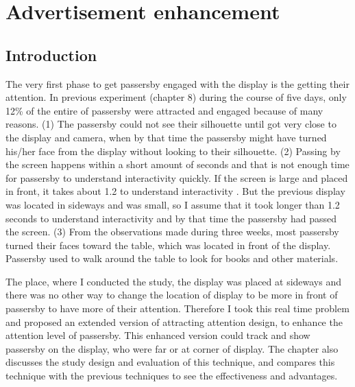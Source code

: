 \chapter{Advertisement enhancement} %

\label{Chapter9} %
\newpage

\section{Introduction}

The very first phase to get passersby engaged with the display is the getting their attention. In previous experiment (chapter 8) during the course of five days, only 12\% of the entire of passersby were attracted and engaged because of many reasons. (1) The passersby could not see their silhouette until got very close to the display and camera, when by that time the passersby might have turned his/her face from the display without looking to their silhouette. (2) Passing by the screen happens within a short amount of seconds and that is not enough time for passersby to understand interactivity quickly. If the screen is large and placed in front, it takes about 1.2 to understand interactivity \cite{LookingGlass}. But the previous display was located in sideways and was small, so I assume that it took longer than 1.2 seconds to understand interactivity and by that time the passersby had passed the screen. (3) From the observations made during three weeks, most passersby turned their faces toward the table, which was located in front of the display. Passersby used to walk around the table to look for books and other materials. 

The place, where I conducted the study, the display was placed at sideways and there was no other way to change the location of display to be more in front of passersby to have more of their attention. Therefore I took this real time problem and proposed an extended version of attracting attention design, to enhance the attention level of passersby. This enhanced version could track and show passersby on the display, who were far or at corner of display. The chapter also discusses the study design and evaluation of this technique, and compares this technique with the previous techniques to see the effectiveness and advantages.



